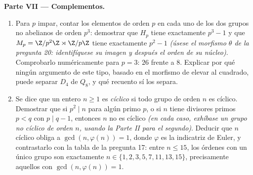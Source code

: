 \begin{problem}
\medskip
\noindent\textbf{Parte VII --- Complementos.}
\begin{enumerate}[resume]
  \item Para $p$ impar, contar los elementos de orden $p$ en cada uno de
  los dos grupos no abelianos de orden $p^3$: demostrar que $H_p$ tiene
  exactamente $p^3 - 1$ y que $M_p =
        \Z/p^2\Z \rtimes \Z/p\Z$ tiene exactamente $p^2 - 1$
  \emph{(úsese el morfismo $\theta$ de la pregunta 20: identifíquese su
  imagen y después el orden de su núcleo)}. Comprobarlo numéricamente
  para $p = 3$: $26$ frente a $8$. Explicar por qué ningún argumento de
  este tipo, basado en el morfismo de elevar al cuadrado, puede separar
  $D_4$ de $Q_8$, y qué recuento sí los separa. \item Se dice que un
  entero $n \geq 1$ es \emph{cíclico} si todo grupo de orden $n$ es
  cíclico. Demostrar que si $p^2 \mid n$ para algún primo $p$, o si $n$
  tiene divisores primos $p < q$ con $p \mid q - 1$, entonces $n$ no es
  cíclico \emph{(en cada caso, exhíbase un grupo no cíclico de orden
  $n$, usando la Parte II para el segundo)}. Deducir que $n$ cíclico
  obliga a $\gcd(n, \varphi(n)) = 1$, donde $\varphi$ es la indicatriz
  de Euler, y contrastarlo con la tabla de la pregunta 17: entre
  $n \leq 15$, los órdenes con un único grupo son exactamente
  $n \in \{1, 2, 3, 5, 7, 11, 13, 15\}$, precisamente aquellos con
  $\gcd(n, \varphi(n)) = 1$.
\end{enumerate}
\end{problem}
